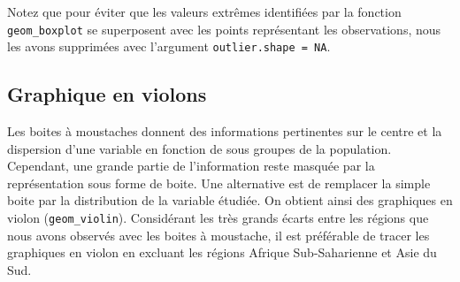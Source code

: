\documentclass[
  11pt,
  french,
]{book}
\makeatletter
\newenvironment{Shaded}{\begin{snugshade}}{\end{snugshade}}
\newcommand{\CommentTok}[1]{\textcolor[rgb]{0.56,0.35,0.01}{\textit{#1}}}
\newcommand{\DataTypeTok}[1]{\textcolor[rgb]{0.13,0.29,0.53}{#1}}
\newcommand{\DecValTok}[1]{\textcolor[rgb]{0.00,0.00,0.81}{#1}}
\newcommand{\KeywordTok}[1]{\textcolor[rgb]{0.13,0.29,0.53}{\textbf{#1}}}
\newcommand{\NormalTok}[1]{#1}
\newcommand{\OperatorTok}[1]{\textcolor[rgb]{0.81,0.36,0.00}{\textbf{#1}}}
\newcommand{\OtherTok}[1]{\textcolor[rgb]{0.56,0.35,0.01}{#1}}
\newcommand{\StringTok}[1]{\textcolor[rgb]{0.31,0.60,0.02}{#1}}
\newenvironment{kframe}{%
\medskip{}
\setlength{\fboxsep}{.8em}
 \def\at@end@of@kframe{}%
 \ifinner\ifhmode%
  \def\at@end@of@kframe{\end{minipage}}%
  \begin{minipage}{\columnwidth}%
 \fi\fi%
 \def\FrameCommand##1{\hskip\@totalleftmargin \hskip-\fboxsep
 \colorbox{shadecolor}{##1}\hskip-\fboxsep
     \hskip-\linewidth \hskip-\@totalleftmargin \hskip\columnwidth}%
 \MakeFramed {\advance\hsize-\width
   \@totalleftmargin\z@ \linewidth\hsize
   \@setminipage}}%
 {\par\unskip\endMakeFramed%
 \at@end@of@kframe}
\renewenvironment{Shaded}{\begin{kframe}}{\end{kframe}}
\makeatother
\begin{document}
Notez que pour éviter que les valeurs extrêmes identifiées par la fonction \texttt{geom\_boxplot} se superposent avec les points représentant les observations, nous les avons supprimées avec l'argument \texttt{outlier.shape\ =\ NA}.

\hypertarget{sect0326}{%
\subsection{Graphique en violons}\label{sect0326}}

Les boites à moustaches donnent des informations pertinentes sur le centre et la dispersion d'une variable en fonction de sous groupes de la population. Cependant, une grande partie de l'information reste masquée par la représentation sous forme de boite. Une alternative est de remplacer la simple boite par la distribution de la variable étudiée. On obtient ainsi des graphiques en violon (\texttt{geom\_violin}). Considérant les très grands écarts entre les régions que nous avons observés avec les boites à moustache, il est préférable de tracer les graphiques en violon en excluant les régions Afrique Sub-Saharienne et Asie du Sud.

\begin{Shaded}
\end{Shaded}
\end{document}
